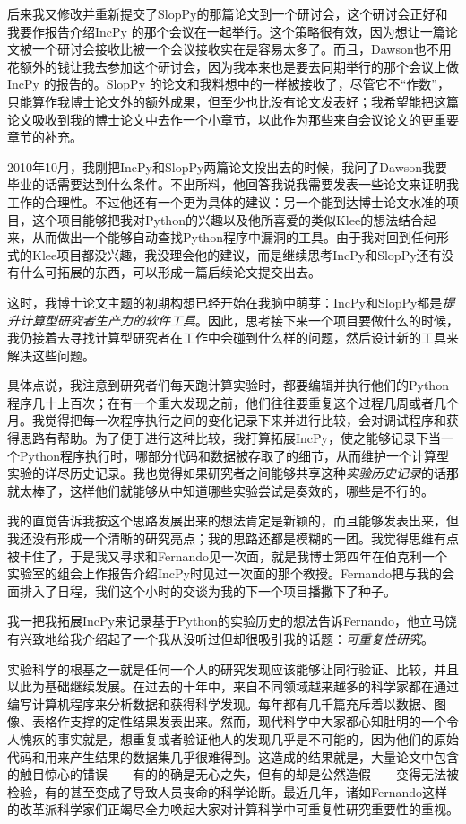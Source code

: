 \documentclass[letter,12pt]{book}
\begin{document}
\begin{CJK}{UTF8}{gbsn}
后来我又修改并重新提交了SlopPy的那篇论文到一个研讨会，这个研讨会正好和我要作报告介绍IncPy 的那个会议在一起举行。这个策略很有效，因为想让一篇论文被一个研讨会接收比被一个会议接收实在是容易太多了。而且，Dawson也不用花额外的钱让我去参加这个研讨会，因为我本来也是要去同期举行的那个会议上做IncPy 的报告的。SlopPy 的论文和我料想中的一样被接收了，尽管它不“作数”，只能算作我博士论文外的额外成果，但至少也比没有论文发表好；我希望能把这篇论文吸收到我的博士论文中去作一个小章节，以此作为那些来自会议论文的更重要章节的补充。

\breakline

2010年10月，我刚把IncPy和SlopPy两篇论文投出去的时候，我问了Dawson我要毕业的话需要达到什么条件。不出所料，他回答我说我需要发表一些论文来证明我工作的合理性。不过他还有一个更为具体的建议：另一个能到达博士论文水准的项目，这个项目能够把我对Python的兴趣以及他所喜爱的类似Klee的想法结合起来，从而做出一个能够自动查找Python程序中漏洞的工具。由于我对回到任何形式的Klee项目都没兴趣，我没理会他的建议，而是继续思考IncPy和SlopPy还有没有什么可拓展的东西，可以形成一篇后续论文提交出去。

这时，我博士论文主题的初期构想已经开始在我脑中萌芽：IncPy和SlopPy都是\emph{提升计算型研究者生产力的软件工具}。因此，思考接下来一个项目要做什么的时候，我仍接着去寻找计算型研究者在工作中会碰到什么样的问题，然后设计新的工具来解决这些问题。

具体点说，我注意到研究者们每天跑计算实验时，都要编辑并执行他们的Python程序几十上百次；在有一个重大发现之前，他们往往要重复这个过程几周或者几个月。我觉得把每一次程序执行之间的变化记录下来并进行比较，会对调试程序和获得思路有帮助。为了便于进行这种比较，我打算拓展IncPy，使之能够记录下当一个Python程序执行时，哪部分代码和数据被存取了的细节，从而维护一个计算型实验的详尽历史记录。我也觉得如果研究者之间能够共享这种\emph{实验历史记录}的话那就太棒了，这样他们就能够从中知道哪些实验尝试是奏效的，哪些是不行的。

我的直觉告诉我按这个思路发展出来的想法肯定是新颖的，而且能够发表出来，但我还没有形成一个清晰的研究亮点；我的思路还都是模糊的一团。我觉得思维有点被卡住了，于是我又寻求和Fernando见一次面，就是我博士第四年在伯克利一个实验室的组会上作报告介绍IncPy时见过一次面的那个教授。Fernando把与我的会面排入了日程，我们这个小时的交谈为我的下一个项目播撒下了种子。

\breakline

我一把我拓展IncPy来记录基于Python的实验历史的想法告诉Fernando，他立马饶有兴致地给我介绍起了一个我从没听过但却很吸引我的话题：\emph{可重复性研究}。

实验科学的根基之一就是任何一个人的研究发现应该能够让同行验证、比较，并且以此为基础继续发展。在过去的十年中，来自不同领域越来越多的科学家都在通过编写计算机程序来分析数据和获得科学发现。每年都有几千篇充斥着以数据、图像、表格作支撑的定性结果发表出来。然而，现代科学中大家都心知肚明的一个令人愧疚的事实就是，想重复或者验证他人的发现几乎是不可能的，因为他们的原始代码和用来产生结果的数据集几乎很难得到。这造成的结果就是，大量论文中包含的触目惊心的错误——有的的确是无心之失，但有的却是公然造假——变得无法被检验，有的甚至变成了导致人员丧命的科学论断。最近几年，诸如Fernando这样的改革派科学家们正竭尽全力唤起大家对计算科学中可重复性研究重要性的重视。


\end{CJK}
\end{document}
